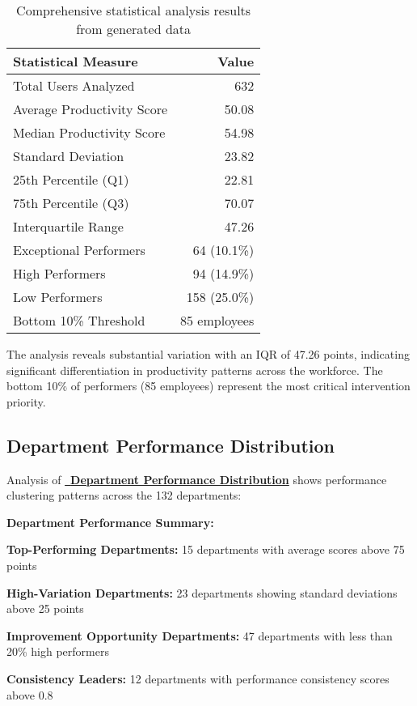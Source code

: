 \documentclass[12pt,a4paper]{article}
\begin{document}
\begin{table}[H]
\centering
\begin{tabular}{@{}lr@{}}
\toprule
\textbf{\color{primaryBlue}Statistical Measure} & \textbf{\color{primaryBlue}Value} \\
\midrule
Total Users Analyzed & 632 \\
Average Productivity Score & 50.08 \\
Median Productivity Score & 54.98 \\
Standard Deviation & 23.82 \\
25th Percentile (Q1) & 22.81 \\
75th Percentile (Q3) & 70.07 \\
Interquartile Range & 47.26 \\
Exceptional Performers & 64 (10.1\%) \\
High Performers & 94 (14.9\%) \\
Low Performers & 158 (25.0\%) \\
Bottom 10\% Threshold & 85 employees \\
\bottomrule
\end{tabular}
\caption{Comprehensive statistical analysis results from generated data}
\end{table}

The analysis reveals substantial variation with an IQR of 47.26 points, indicating significant differentiation in productivity patterns across the workforce. The bottom 10\% of performers (85 employees) represent the most critical intervention priority.

\subsection{Department Performance Distribution}

Analysis of \textcolor{primaryBlue}{\href{https://fixysaskihumorizijuv.supabase.co/storage/v1/object/public/research-files/61dcab8f-47f2-46f1-855f-7e95c4447bf0-department_performance_distribution.csv?download=}{{\normalsize\faSitemap}\, \textbf{Department Performance Distribution}}} shows performance clustering patterns across the 132 departments:

\begin{infobox}
\textbf{\faBuilding \quad Department Performance Summary:}

\textbf{Top-Performing Departments:} 15 departments with average scores above 75 points

\textbf{High-Variation Departments:} 23 departments showing standard deviations above 25 points

\textbf{Improvement Opportunity Departments:} 47 departments with less than 20\% high performers

\textbf{Consistency Leaders:} 12 departments with performance consistency scores above 0.8
\end{infobox}
\end{document}
